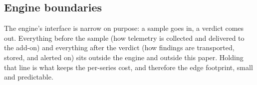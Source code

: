 \subsection{Engine boundaries}
The engine's interface is narrow on purpose: a sample goes in, a verdict comes out.
Everything before the sample (how telemetry is collected and delivered to the
add-on) and everything after the verdict (how findings are transported, stored,
and alerted on) sits outside the engine and outside this paper. Holding that line
is what keeps the per-series cost, and therefore the edge footprint, small and
predictable.
